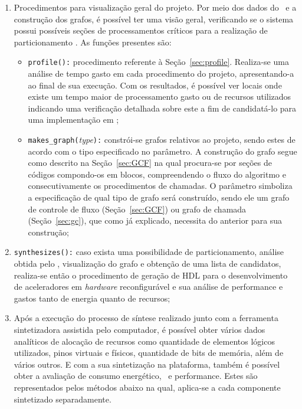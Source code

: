       \begin{enumerate}
         \item Procedimentos para visualização geral do projeto.
         Por meio dos dados do \profile\ e a construção dos grafos, é possível ter uma visão geral, verificando se o sistema possui possíveis seções de processamentos críticos para a realização de particionamento \hs.
         As funções presentes são:

         \begin{itemize}
            \item \texttt{profile():}
               procedimento referente à Seção~\ref{sec:profile}.
               Realiza-se uma análise de tempo gasto em cada procedimento do projeto, apresentando-a ao final de sua execução.
               Com os resultados, é possível ver locais onde existe um tempo maior de processamento gasto ou de recursos utilizados indicando uma verificação detalhada sobre este a fim de candidatá-lo para uma implementação em \hardware;

            \item \texttt{makes\_graph(}\textit{type}\texttt{):}
               constrói-se grafos relativos ao projeto, sendo estes de acordo com o tipo especificado no parâmetro.
               A construção do grafo segue como descrito na Seção~\ref{sec:GCF} na qual procura-se por seções de códigos compondo-os em blocos, compreendendo o fluxo do algoritmo e consecutivamente os procedimentos de chamadas.
               O parâmetro simboliza a especificação de qual tipo de grafo será construído, sendo ele um grafo de controle de fluxo (Seção~\ref{sec:GCF}) ou grafo de chamada (Seção~\ref{sec:gc}), que como já explicado, necessita do anterior para sua construção;
         \end{itemize}

         \item \texttt{synthesizes():}
            caso exista uma possibilidade de particionamento, análise obtida pelo \profile, visualização do grafo e obtenção de uma lista de candidatos, realiza-se então o procedimento de geração de HDL para o desenvolvimento de aceleradores em \textit{hardware} reconfigurável e sua análise de performance e gastos tanto de energia quanto de recursos;

         \item Após a execução do processo de síntese realizado junto com a ferramenta sintetizadora assistida pelo computador, é possível obter vários dados analíticos de alocação de recursos como quantidade de elementos lógicos utilizados, pinos virtuais e físicos, quantidade de bits de memória, além de vários outros.
         E com a sua sintetização na plataforma, também é possível obter a avaliação de consumo energético, \profile\ e performance.
         Estes são representados pelos métodos abaixo na qual, aplica-se a cada componente sintetizado separadamente.
         \begin{itemize}


\end{itemize}
\end{enumerate}
